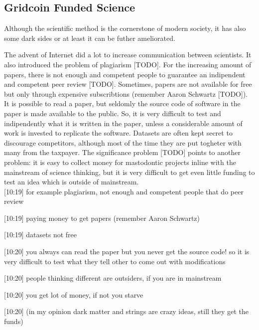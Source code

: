 \subsection{Gridcoin Funded Science}

Although the scientific method is the cornerstone of modern society, it has also some dark sides or at least it can be futher ameliorated. 

The advent of Internet did a lot to increase communication between scientists. It also introduced the problem of plagiarism [TODO]. For the increasing amount of papers, there is not enough and competent people to guarantee an indipendent and competent peer review [TODO]. Sometimes, papers are not available for free but only through expensive subscribtions (remember Aaron Schwartz [TODO]). It is possible to read a paper, but seldomly the source code of software in the paper is made available to the public. So, it is very difficult to test and indipendently what it is written in the paper, unless a considerable amount of work is invested to replicate the software. Datasets are often kept secret to discourage competitors, although most of the time they are put togheter with many from the taxpayer. The significance problem [TODO] points to another problem: it is easy to collect money for mastodontic projects inline with the mainstream of science thinking, but it is very difficult to get even little funding to test an idea which is outside of mainstream.\\



[10:19] 
for example plagiarism, not enough and competent people that do peer review


[10:19] 
paying money to get papers (remember Aaron Schwartz)


[10:19] 
datasets not free


[10:20] 
you always can read the paper but you never get the source code! so it is very difficult to test what they tell other to come out with modifications


[10:20] 
people thinking different are outsiders, if you are in mainstream


[10:20] 
you get lot of money, if not you starve


[10:20] 
(in my opinion dark matter and strings are crazy ideas, still they get the funds)






